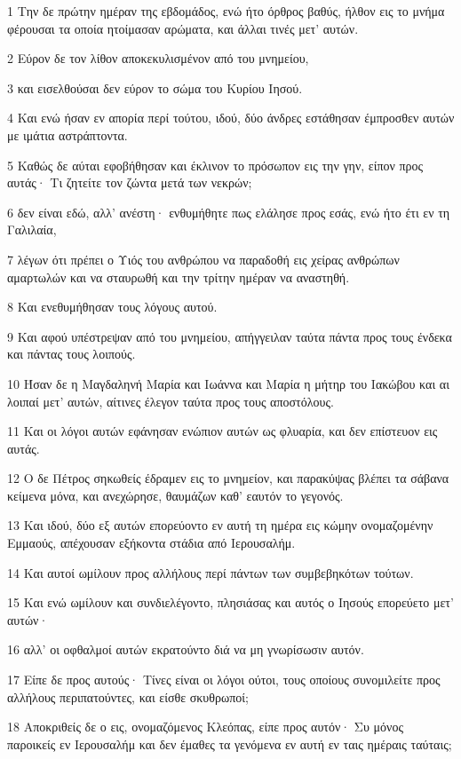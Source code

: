 \par 1 Την δε πρώτην ημέραν της εβδομάδος, ενώ ήτο όρθρος βαθύς, ήλθον εις το μνήμα φέρουσαι τα οποία ητοίμασαν αρώματα, και άλλαι τινές μετ' αυτών.
\par 2 Εύρον δε τον λίθον αποκεκυλισμένον από του μνημείου,
\par 3 και εισελθούσαι δεν εύρον το σώμα του Κυρίου Ιησού.
\par 4 Και ενώ ήσαν εν απορία περί τούτου, ιδού, δύο άνδρες εστάθησαν έμπροσθεν αυτών με ιμάτια αστράπτοντα.
\par 5 Καθώς δε αύται εφοβήθησαν και έκλινον το πρόσωπον εις την γην, είπον προς αυτάς· Τι ζητείτε τον ζώντα μετά των νεκρών;
\par 6 δεν είναι εδώ, αλλ' ανέστη· ενθυμήθητε πως ελάλησε προς εσάς, ενώ ήτο έτι εν τη Γαλιλαία,
\par 7 λέγων ότι πρέπει ο Υιός του ανθρώπου να παραδοθή εις χείρας ανθρώπων αμαρτωλών και να σταυρωθή και την τρίτην ημέραν να αναστηθή.
\par 8 Και ενεθυμήθησαν τους λόγους αυτού.
\par 9 Και αφού υπέστρεψαν από του μνημείου, απήγγειλαν ταύτα πάντα προς τους ένδεκα και πάντας τους λοιπούς.
\par 10 Ήσαν δε η Μαγδαληνή Μαρία και Ιωάννα και Μαρία η μήτηρ του Ιακώβου και αι λοιπαί μετ' αυτών, αίτινες έλεγον ταύτα προς τους αποστόλους.
\par 11 Και οι λόγοι αυτών εφάνησαν ενώπιον αυτών ως φλυαρία, και δεν επίστευον εις αυτάς.
\par 12 Ο δε Πέτρος σηκωθείς έδραμεν εις το μνημείον, και παρακύψας βλέπει τα σάβανα κείμενα μόνα, και ανεχώρησε, θαυμάζων καθ' εαυτόν το γεγονός.
\par 13 Και ιδού, δύο εξ αυτών επορεύοντο εν αυτή τη ημέρα εις κώμην ονομαζομένην Εμμαούς, απέχουσαν εξήκοντα στάδια από Ιερουσαλήμ.
\par 14 Και αυτοί ωμίλουν προς αλλήλους περί πάντων των συμβεβηκότων τούτων.
\par 15 Και ενώ ωμίλουν και συνδιελέγοντο, πλησιάσας και αυτός ο Ιησούς επορεύετο μετ' αυτών·
\par 16 αλλ' οι οφθαλμοί αυτών εκρατούντο διά να μη γνωρίσωσιν αυτόν.
\par 17 Είπε δε προς αυτούς· Τίνες είναι οι λόγοι ούτοι, τους οποίους συνομιλείτε προς αλλήλους περιπατούντες, και είσθε σκυθρωποί;
\par 18 Αποκριθείς δε ο εις, ονομαζόμενος Κλεόπας, είπε προς αυτόν· Συ μόνος παροικείς εν Ιερουσαλήμ και δεν έμαθες τα γενόμενα εν αυτή εν ταις ημέραις ταύταις;
